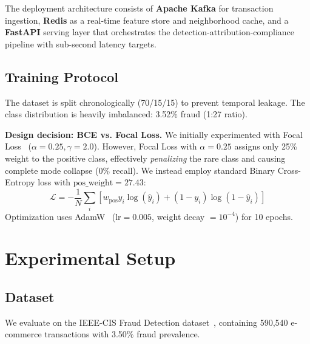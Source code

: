 \documentclass[journal]{IEEEtran}
\begin{document}
The deployment architecture consists of \textbf{Apache Kafka} for transaction ingestion, \textbf{Redis} as a real-time feature store and neighborhood cache, and a \textbf{FastAPI} serving layer that orchestrates the detection-attribution-compliance pipeline with sub-second latency targets.

\subsection{Training Protocol}

The dataset is split chronologically (70/15/15) to prevent temporal leakage. The class distribution is heavily imbalanced: 3.52\% fraud (1:27 ratio). 

\textbf{Design decision: BCE vs. Focal Loss.} We initially experimented with Focal Loss~\cite{lin2017focal} ($\alpha=0.25, \gamma=2.0$). However, Focal Loss with $\alpha=0.25$ assigns only 25\% weight to the positive class, effectively \emph{penalizing} the rare class and causing complete mode collapse (0\% recall). We instead employ standard Binary Cross-Entropy loss with $\text{pos\_weight} = 27.43$:
\begin{equation}
\mathcal{L} = -\frac{1}{N} \sum_i \left[ w_{\text{pos}} y_i \log(\hat{y}_i) + (1-y_i) \log(1-\hat{y}_i) \right]
\end{equation}
Optimization uses AdamW~\cite{loshchilov2019adamw} ($\text{lr} = 0.005$, weight decay $= 10^{-4}$) for 10 epochs.

\section{Experimental Setup}

\subsection{Dataset}
We evaluate on the IEEE-CIS Fraud Detection dataset~\cite{ieee_cis}, containing 590,540 e-commerce transactions with 3.50\% fraud prevalence. 
\end{document}

